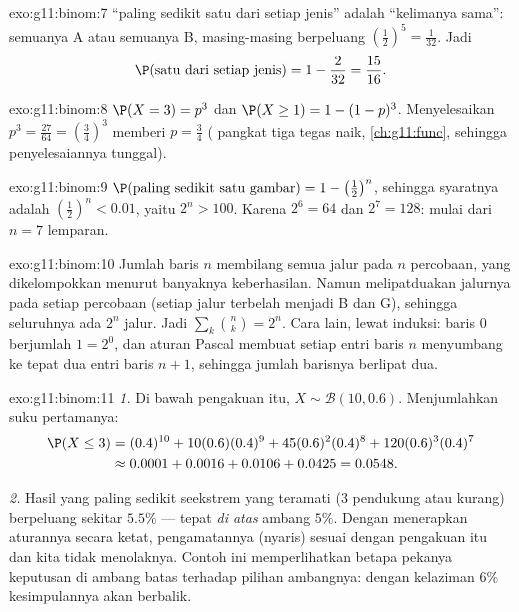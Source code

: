 \begin{solution}{exo:g11:binom:7}
 ``paling sedikit satu dari setiap jenis'' adalah ``kelimanya sama'':
semuanya A atau semuanya B, masing-masing berpeluang $\left(\frac12\right)^5 =
\frac1{32}$. Jadi
\[
\P(\text{satu dari setiap jenis}) = 1 - \frac{2}{32} = \frac{15}{16} .
\]
\end{solution}

\begin{solution}{exo:g11:binom:8}
$\P(X = 3) = p^3$ dan $\P(X \geq 1) = 1 - (1-p)^3$. Menyelesaikan
$p^3 = \frac{27}{64} = \left(\frac34\right)^3$ memberi $p = \frac34$ (
pangkat tiga tegas naik, \cref{ch:g11:func}, sehingga penyelesaiannya
tunggal).
\end{solution}

\begin{solution}{exo:g11:binom:9}
$\P(\text{paling sedikit satu gambar}) = 1 - \left(\frac12\right)^n$, sehingga
syaratnya adalah $\left(\frac12\right)^n < 0.01$, yaitu $2^n > 100$. Karena
$2^6 = 64$ dan $2^7 = 128$: mulai dari $n = 7$ lemparan.
\end{solution}

\begin{solution}{exo:g11:binom:10}
Jumlah baris $n$ membilang semua jalur pada  $n$ percobaan, yang
dikelompokkan menurut banyaknya keberhasilan. Namun  melipatduakan
jalurnya pada setiap percobaan (setiap jalur terbelah menjadi B dan G),
sehingga seluruhnya ada $2^n$ jalur. Jadi
$\sum_{k} \binom nk = 2^n$. Cara lain, lewat induksi: baris $0$ berjumlah
$1 = 2^0$, dan aturan Pascal membuat setiap entri baris $n$ menyumbang ke
tepat dua entri baris $n+1$, sehingga jumlah barisnya berlipat dua.
\end{solution}

\begin{solution}{exo:g11:binom:11}
\emph{1.} Di bawah pengakuan itu, $X \sim \mathcal B(10, 0.6)$. Menjumlahkan
suku pertamanya:
\begin{align*}
\P(X \leq 3)
&= (0.4)^{10} + 10(0.6)(0.4)^9 + 45(0.6)^2(0.4)^8
+ 120(0.6)^3(0.4)^7\\
&\approx 0.0001 + 0.0016 + 0.0106 + 0.0425 = 0.0548 .
\end{align*}

\emph{2.} Hasil yang paling sedikit seekstrem yang teramati ($3$ pendukung
atau kurang) berpeluang sekitar $5.5\%$ --- tepat \emph{di atas} ambang
$5\%$. Dengan menerapkan aturannya secara ketat, pengamatannya (nyaris)
sesuai dengan pengakuan itu dan kita tidak menolaknya. Contoh ini memperlihatkan
betapa pekanya keputusan di ambang batas terhadap pilihan ambangnya: dengan
kelaziman $6\%$ kesimpulannya akan berbalik.
\end{solution}

